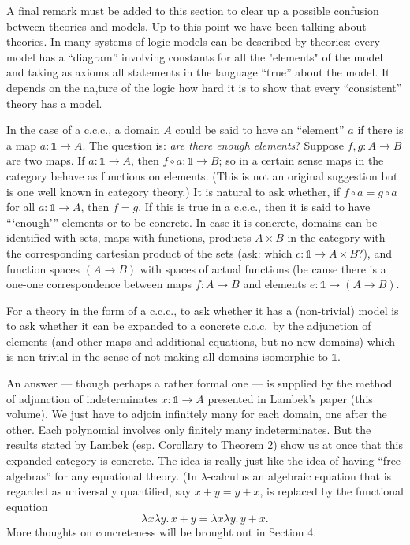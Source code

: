 \documentclass[12pt]{article}
\def\to{\rightarrow}
\def\comp{\circ}
\def\bbone{\mathbb 1}
\def\ccc{{c.c.c.}}
\def\l{\lambda}
\begin{document}
A final remark must be added to this section to clear up a possible confusion between theories and models.
Up to this point we have been talking about theories. In many systems of logic models can be described by theories: every model has a ``diagram'' involving constants for all the "elements" of the model and taking as axioms all statements in the language ``true'' about the model. It depends on the na,ture of the logic how hard it is to show that every ``consistent'' theory has a model.

In the case of a \ccc, a domain $A$ could be said to have an ``element'' $a$ if there is a map $a: \bbone \to A$. The question is: {\it are there enough elements}? Suppose $f,g: A\to B$ are two maps. If $a : \bbone \to A$, then $f \comp a: \bbone \to B$; so in a certain sense maps in the category behave as functions on elements. (This is not an original suggestion but is one well known in category theory.) It is natural to ask whether, if  $f \comp a	= g\comp a$ for all $a : \bbone \to A$, then $f = g$. If this is true in a \ccc, then it is said to have ```enough''' elements or to be concrete. In case it is concrete, domains can be identified with sets, maps with functions, products $A \times B$ in the category with the corresponding cartesian product of the sets (ask: which $c : \bbone \to A \times B$?), and function spaces $(A \to B)$ with spaces of actual functions (be cause there is a one-one correspondence between maps $f : A \to B$ and elements $e: \bbone \to (A \to B)$.

For a theory in the form of a \ccc, to ask whether it has a (non-trivial) model is to ask whether it can be expanded to a concrete \ccc\ by the adjunction of elements (and other maps and additional equations, but no new domains) which is non trivial in the sense of not making all domains isomorphic to $\bbone$.

An answer --- though perhaps a rather formal one --- is supplied by the method of adjunction of indeterminates $x: \bbone \to A$ presented in Lambek's paper (this volume). We just have to adjoin infinitely many for each domain, one after the other. Each polynomial involves only finitely many indeterminates. But the results stated by Lambek (esp. Corollary to Theorem 2) show us at once that this expanded category is concrete. The idea is really just like the idea of having ``free algebras'' for any equational theory. (In $\l$-calculus an algebraic equation that is regarded as universally quantified, say $x + y = y + x$, is replaced by the functional equation
$$
\l x \l y . \, x + y = \l x \l y . \, y + x.
$$
%
More thoughts on concreteness will be brought out in Section 4.
\end{document}
